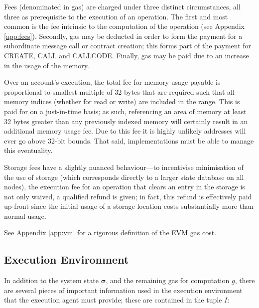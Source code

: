 \documentclass[9pt,oneside]{amsart}
\begin{document}
\begin{multicols}{2}
Fees (denominated in gas) are charged under three distinct circumstances, all three as prerequisite to the execution of an operation. The first and most common is the fee intrinsic to the computation of the operation (see Appendix \ref{app:fees}). Secondly, gas may be deducted in order to form the payment for a subordinate message call or contract creation; this forms part of the payment for {\small CREATE}, {\small CALL} and {\small CALLCODE}. Finally, gas may be paid due to an increase in the usage of the memory.

Over an account's execution, the total fee for memory-usage payable is proportional to smallest multiple of 32 bytes that are required such that all memory indices (whether for read or write) are included in the range. This is paid for on a just-in-time basis; as such, referencing an area of memory at least 32 bytes greater than any previously indexed memory will certainly result in an additional memory usage fee. Due to this fee it is highly unlikely addresses will ever go above 32-bit bounds. That said, implementations must be able to manage this eventuality.

Storage fees have a slightly nuanced behaviour---to incentivise minimisation of the use of storage (which corresponds directly to a larger state database on all nodes), the execution fee for an operation that clears an entry in the storage is not only waived, a qualified refund is given; in fact, this refund is effectively paid up-front since the initial usage of a storage location costs substantially more than normal usage.

See Appendix \ref{app:vm} for a rigorous definition of the EVM gas cost.

\subsection{Execution Environment}

In addition to the system state $\boldsymbol{\sigma}$, and the remaining gas for computation $g$, there are several pieces of important information used in the execution environment that the execution agent must provide; these are contained in the tuple $I$:


\end{multicols}
\end{document}

